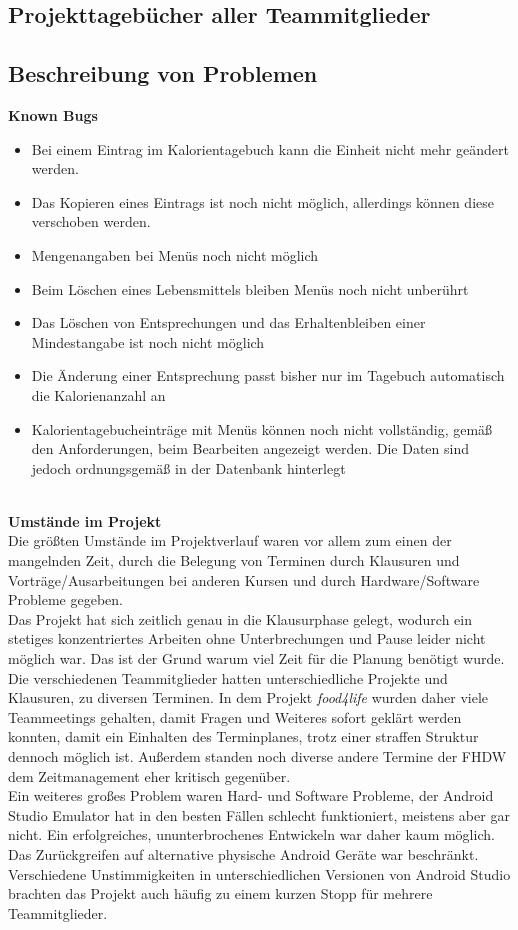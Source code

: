 \subsection{Projekttagebücher aller Teammitglieder}

\subsection{Beschreibung von Problemen}
\textbf{Known Bugs}\\

\begin{itemize}
\item Bei einem Eintrag im Kalorientagebuch kann die Einheit nicht mehr geändert werden.
\item Das Kopieren eines Eintrags ist noch nicht möglich, allerdings können diese verschoben werden.
\item Mengenangaben bei Menüs noch nicht möglich
\item Beim Löschen eines Lebensmittels bleiben Menüs noch nicht unberührt
\item Das Löschen von Entsprechungen und das Erhaltenbleiben einer Mindestangabe ist noch nicht möglich
\item Die Änderung einer Entsprechung passt bisher nur im Tagebuch automatisch die Kalorienanzahl an
\item Kalorientagebucheinträge mit Menüs können noch nicht vollständig, gemäß den Anforderungen, beim Bearbeiten angezeigt werden. Die Daten sind jedoch ordnungsgemäß in der Datenbank hinterlegt
\end{itemize}\\

\textbf{Umstände im Projekt}\\

Die größten Umstände im Projektverlauf waren vor allem zum einen der mangelnden Zeit, durch die Belegung von Terminen durch Klausuren und Vorträge/Ausarbeitungen bei anderen Kursen und durch Hardware/Software Probleme gegeben.\\
Das Projekt hat sich zeitlich genau in die Klausurphase gelegt, wodurch ein stetiges konzentriertes Arbeiten ohne Unterbrechungen und Pause leider nicht möglich war. Das ist der Grund warum viel Zeit für die Planung benötigt wurde. Die verschiedenen Teammitglieder hatten unterschiedliche Projekte und Klausuren, zu diversen Terminen. In dem Projekt 
\textit{food4life}
wurden daher viele Teammeetings gehalten, damit Fragen und Weiteres sofort geklärt werden konnten, damit ein Einhalten des Terminplanes, trotz einer straffen Struktur dennoch möglich ist. Außerdem standen noch diverse andere Termine der FHDW dem Zeitmanagement eher kritisch gegenüber.\\
Ein weiteres großes Problem waren Hard- und Software Probleme, der Android Studio Emulator hat in den besten Fällen schlecht funktioniert, meistens aber gar nicht. Ein erfolgreiches, ununterbrochenes Entwickeln war daher kaum möglich. Das Zurückgreifen auf alternative physische Android Geräte war beschränkt. Verschiedene Unstimmigkeiten in unterschiedlichen Versionen von Android Studio brachten das Projekt auch häufig zu einem kurzen Stopp für mehrere Teammitglieder.
